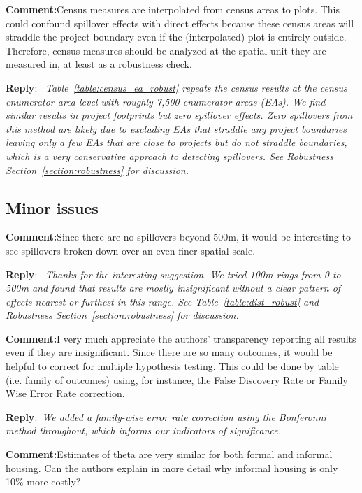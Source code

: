 \documentclass{article}
\newcommand{\reply}{\medskip \noindent \textbf{Reply}:\ \textit }
\newcommand{\sr}{\begin{minipage}{\dimexpr\textwidth-3cm}}
\newcommand{\er}{\end{minipage}}
\newcommand{\cc}{\medskip \noindent \textbf{Comment:}\hspace{2em}}
\begin{document}
\cc Census measures are interpolated from census areas to plots. This could confound spillover effects with direct effects because these census areas will straddle the project boundary even if the (interpolated) plot is entirely outside. Therefore, census measures should be analyzed at the spatial unit they are measured in, at least as a robustness check.

\sr
\reply{ Table~\ref{table:census_ea_robust} repeats the census results at the census enumerator area level with roughly 7,500 enumerator areas (EAs).  We find similar results in project footprints but zero spillover effects.  Zero spillovers from this method are likely due to excluding EAs that straddle any project boundaries leaving only a few EAs that are close to projects but do not straddle boundaries, which is a very conservative approach to detecting spillovers. See Robustness Section~\ref{section:robustness} for discussion. }\\
\er

\subsection{Minor issues}

\cc Since there are no spillovers beyond 500m, it would be interesting to see spillovers broken down over an even finer spatial scale.

\sr
\reply{ Thanks for the interesting suggestion.  We tried 100m rings from 0 to 500m and found that results are mostly insignificant without a clear pattern of effects nearest or furthest in this range. See Table~\ref{table:dist_robust} and Robustness Section~\ref{section:robustness} for discussion.}\\
\er

\cc I very much appreciate the authors' transparency reporting all results even if they are insignificant. Since there are so many outcomes, it would be helpful to correct for multiple hypothesis testing. This could be done by table (i.e. family of outcomes) using, for instance, the False Discovery Rate or Family Wise Error Rate correction.

\sr
\reply{We added a family-wise error rate correction using the Bonferonni method throughout, which informs our indicators of significance.}\\
\er

\cc Estimates of theta are very similar for both formal and informal housing. Can the authors explain in more detail why informal housing is only 10\% more costly?
\end{document}
